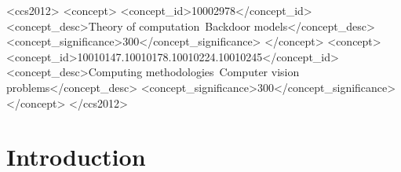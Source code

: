 \documentclass[sigconf,authordraft]{acmart}
\begin{document}
\begin{CCSXML}
<ccs2012>
<concept>
<concept_id>10002978</concept_id>
<concept_desc>Theory of computation~Backdoor models</concept_desc>
<concept_significance>300</concept_significance>
</concept>
<concept>
<concept_id>10010147.10010178.10010224.10010245</concept_id>
<concept_desc>Computing methodologies~Computer vision problems</concept_desc>
<concept_significance>300</concept_significance>
</concept>
</ccs2012>
\end{CCSXML}





\maketitle

\section{Introduction}
\label{sec:intro}
\end{document}
